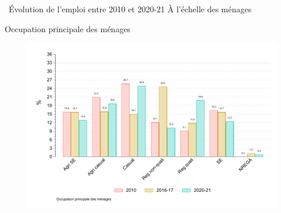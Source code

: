 \documentclass[aspectratio=169]{beamer}
\begin{document}

\begin{frame}{\faCommentsO ~Évolution de l'emploi entre 2010 et 2020-21}
    \centering
    {\fontsize{20}{30}\selectfont À l'échelle des ménages}
\end{frame}


\begin{frame}[plain, shrink=2]{Occupation principale des ménages}
\begin{figure}[htpb]
\centering
\includegraphics[scale=0.9]{INPUT/evo_moc_HH.pdf}
\end{figure}
\end{frame}
\end{document}

